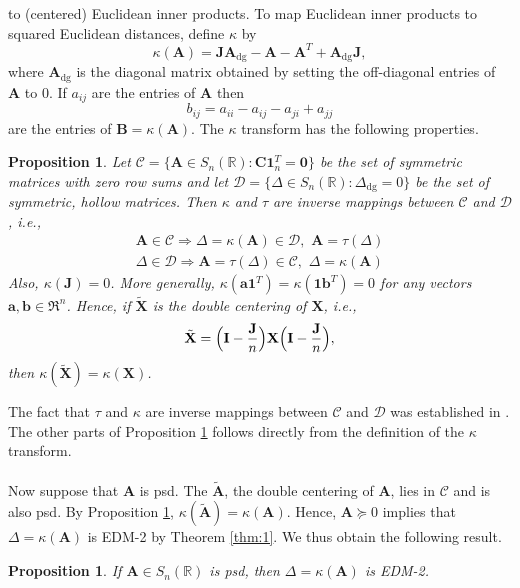 \documentclass[10pt,twocolumn]{article}
\newtheorem{proposition}[theorem]{Proposition}
\numberwithin{equation}{section}
\begin{document}
to (centered) Euclidean inner products.  To map Euclidean inner
products to squared Euclidean distances, define $\kappa$ by
\begin{equation}
  \label{eq:2}
  \kappa(\mathbf{A}) = \mathbf{J}\mathbf{A}_{\mathrm{dg}} -
  \mathbf{A} - \mathbf{A}^{T} + \mathbf{A}_{\mathrm{dg}}\mathbf{J},
\end{equation}
where $\mathbf{A}_{\mathrm{dg}}$ is the diagonal matrix obtained by
setting the off-diagonal entries of $\mathbf{A}$ to $0$. If $a_{ij}$
are the entries of $\mathbf{A}$ then
\begin{equation}
  \label{eq:3}
  b_{ij} = a_{ii} - a_{ij} - a_{ji} + a_{jj}
\end{equation}
are the entries of $\mathbf{B} = \kappa(\mathbf{A})$. The $\kappa$
transform has the following properties.
\begin{proposition}
  \label{prop:1}
  Let $\mathcal{C} = \{ \mathbf{A} \in S_n(\mathbb{R}) \colon
  \mathbf{C}\bm{1}_{n}^{T} = \bm{0} \}$ be the set of symmetric
  matrices with zero row sums and let $\mathcal{D} = \{ \Delta \in
  S_n(\mathbb{R}) \colon \Delta_{\mathrm{dg}} = 0 \}$ be the set of
  symmetric, hollow matrices. Then $\kappa$ and $\tau$ are inverse
  mappings between $\mathcal{C}$ and $\mathcal{D}$, i.e.,
  \begin{gather}
    \label{eq:55}
    \mathbf{A} \in \mathcal{C}
    \Longrightarrow \Delta = \kappa(\mathbf{A}) \in \mathcal{D}, \,\,
    \mathbf{A} = \tau(\Delta) \\
    \Delta \in \mathcal{D} \Longrightarrow \mathbf{A} = \tau(\Delta)
    \in \mathcal{C}, \,\, \Delta = \kappa(\mathbf{A})
  \end{gather}
  Also, $\kappa(\mathbf{J}) = 0$. More generally,
  $\kappa(\bm{a}\bm{1}^{T}) = \kappa(\bm{1}\bm{b}^{T}) = 0$ for any
  vectors $\bm{a},\bm{b} \in \Re^n$. Hence, if $\tilde{\mathbf{X}}$ is the
  double centering of $\mathbf{X}$, i.e.,
  \begin{equation}
    \label{eq:4}
    \tilde{\mathbf{X}} = \Bigl(\mathbf{I} - 
\frac{\mathbf{J}}{n}\Bigr)\mathbf{X} \Bigl(\mathbf{I} - 
\frac{\mathbf{J}}{n}\Bigr),
  \end{equation}
  then $\kappa(\tilde{\mathbf{X}}) = \kappa(\mathbf{X})$.
\end{proposition}
\noindent
The fact that $\tau$ and $\kappa$
are inverse mappings between $\mathcal{C}$ and $\mathcal{D}$ was
established in
\cite{critchley88:_certain_linear_mappin}. 
The other parts of
Proposition \ref{prop:1} follows directly from the definition of the
$\kappa$ transform. \\ \\
%
\indent
Now suppose that $\mathbf{A}$ is psd.
The $\tilde{\mathbf{A}}$, the double centering of $\mathbf{A}$, lies
in $\mathcal{C}$ and is also psd. By Proposition
\ref{prop:1}, $\kappa(\tilde{\mathbf{A}}) = \kappa(\mathbf{A})$. 
Hence,
$\mathbf{A} \succeq 0$ implies that $\Delta = \kappa(\mathbf{A})$ is
EDM-2 by Theorem \ref{thm:1}. We thus obtain the following result.
\begin{proposition}
  \label{prop:2}
  If $\mathbf{A} \in S_n(\mathbb{R})$ is psd, then $\Delta =
  \kappa(\mathbf{A})$ is EDM-2.
\end{proposition}
\end{document}
